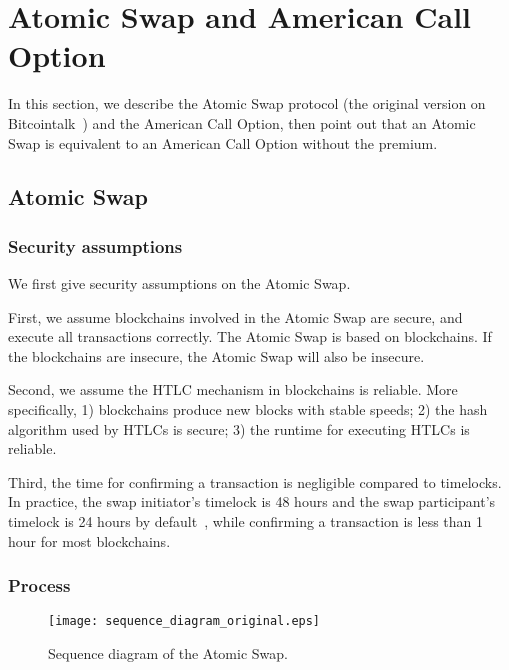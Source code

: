 \section{Atomic Swap and American Call Option}
\label{sec:formalization}

In this section, we describe the Atomic Swap protocol (the original version on Bitcointalk~\cite{nolan2013alt}) and the American Call Option,
then point out that an Atomic Swap is equivalent to an American Call Option without the premium.





\subsection{Atomic Swap}

\subsubsection{Security assumptions}

We first give security assumptions on the Atomic Swap.

First, we assume blockchains involved in the Atomic Swap are secure, and execute all transactions correctly.
The Atomic Swap is based on blockchains.
If the blockchains are insecure, the Atomic Swap will also be insecure.

Second, we assume the HTLC mechanism in blockchains is reliable.
More specifically,
1) blockchains produce new blocks with stable speeds;
2) the hash algorithm used by HTLCs is secure;
3) the runtime for executing HTLCs is reliable.


Third, the time for confirming a transaction is negligible compared to timelocks.
In practice, the swap initiator's timelock is 48 hours and the swap participant's timelock is 24 hours by default~\cite{nolan2013alt}, while confirming a transaction is less than 1 hour for most blockchains.


\subsubsection{Process}


\begin{figure}
    \texttt{[image: sequence\_diagram\_original.eps]}
    \caption{Sequence diagram of the Atomic Swap.}
    \label{fig:sequence_diagram_original}
\end{figure}


